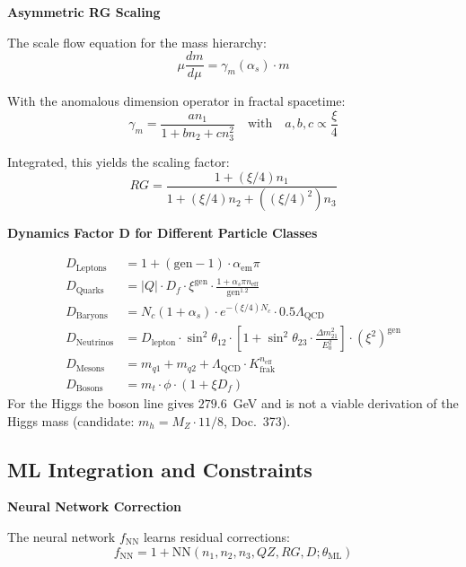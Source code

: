 	\textbf{Asymmetric RG Scaling}
	
	The scale flow equation for the mass hierarchy:
	\begin{equation}
		\mu \frac{dm}{d\mu} = \gamma_m(\alpha_s) \cdot m
	\end{equation}
	
	With the anomalous dimension operator in fractal spacetime:
	\begin{equation}
		\gamma_m = \frac{a n_1}{1 + b n_2 + c n_3^2} \quad \text{with} \quad a,b,c \propto \frac{\xi}{4}
	\end{equation}
	
	Integrated, this yields the scaling factor:
	\begin{equation}
		RG = \frac{1 + (\xi/4) n_1}{1 + (\xi/4) n_2 + ((\xi/4)^2) n_3}
	\end{equation}
	
	\textbf{Dynamics Factor D for Different Particle Classes}
	
	\begin{align}
		D_{\text{Leptons}} &= 1 + (\text{gen} - 1) \cdot \alpha_{\text{em}} \pi \\
		D_{\text{Quarks}} &= |Q| \cdot D_f \cdot \xi^{\text{gen}} \cdot \frac{1 + \alpha_s \pi n_{\text{eff}}}{\text{gen}^{1.2}} \\
		D_{\text{Baryons}} &= N_c (1 + \alpha_s) \cdot e^{-(\xi/4) N_c} \cdot 0.5 \Lambda_{\text{QCD}} \\
		D_{\text{Neutrinos}} &= D_{\text{lepton}} \cdot \sin^2 \theta_{12} \cdot \left[1 + \sin^2 \theta_{23} \cdot \frac{\Delta m^2_{21}}{E_0^2}\right] \cdot (\xi^2)^{\text{gen}} \\
		D_{\text{Mesons}} &= m_{q1} + m_{q2} + \Lambda_{\text{QCD}} \cdot K_{\text{frak}}^{n_{\text{eff}}} \\
		D_{\text{Bosons}} &= m_t \cdot \phi \cdot (1 + \xi D_f)
	\end{align}
	For the Higgs the boson line gives $279.6$~GeV and is not a viable derivation of the Higgs mass (candidate: $m_h = M_Z \cdot 11/8$, Doc.~373).
	
	\subsection{ML Integration and Constraints}
	
	\textbf{Neural Network Correction}
	
	The neural network $f_{\text{NN}}$ learns residual corrections:
	\begin{equation}
		f_{\text{NN}} = 1 + \text{NN}(n_1, n_2, n_3, QZ, RG, D; \theta_{\text{ML}})
	\end{equation}
	
